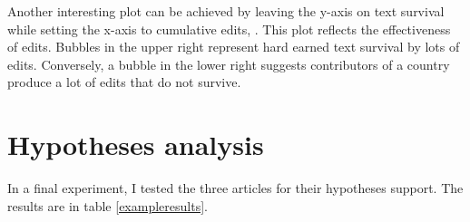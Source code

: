 Another interesting plot can be achieved by leaving the y-axis on text survival while setting the x-axis to cumulative edits, .
This plot reflects the effectiveness of edits. 
Bubbles in the upper right represent hard earned text survival by lots of edits.
Conversely, a bubble in the lower right suggests contributors of a country produce a lot of edits that do not survive.

\section{Hypotheses analysis}\label{sec:hypothesisanalysis}

In a final experiment, I tested the three articles for their hypotheses support.
The results are in table \ref{exampleresults}.

